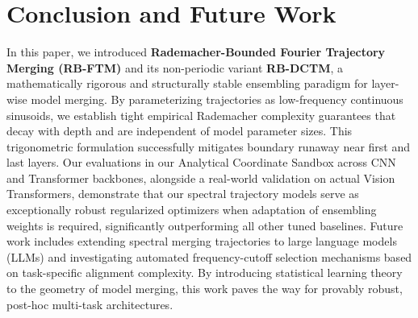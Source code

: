 \section{Conclusion and Future Work}
\label{sec:conclusion}

In this paper, we introduced \textbf{Rademacher-Bounded Fourier Trajectory Merging (RB-FTM)} and its non-periodic variant \textbf{RB-DCTM}, a mathematically rigorous and structurally stable ensembling paradigm for layer-wise model merging. By parameterizing trajectories as low-frequency continuous sinusoids, we establish tight empirical Rademacher complexity guarantees that decay with depth and are independent of model parameter sizes. This trigonometric formulation successfully mitigates boundary runaway near first and last layers. Our evaluations in our Analytical Coordinate Sandbox across CNN and Transformer backbones, alongside a real-world validation on actual Vision Transformers, demonstrate that our spectral trajectory models serve as exceptionally robust regularized optimizers when adaptation of ensembling weights is required, significantly outperforming all other tuned baselines. Future work includes extending spectral merging trajectories to large language models (LLMs) and investigating automated frequency-cutoff selection mechanisms based on task-specific alignment complexity. By introducing statistical learning theory to the geometry of model merging, this work paves the way for provably robust, post-hoc multi-task architectures.